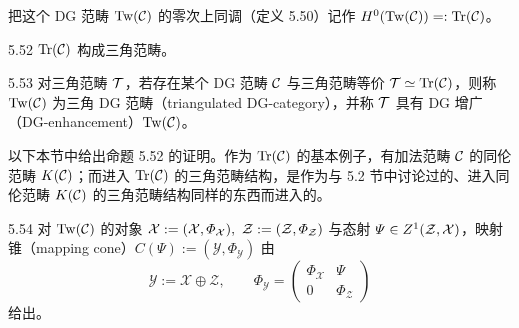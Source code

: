 把这个 DG 范畴 $\mathrm{Tw}(\mathcal{C})$ 的零次上同调（定义 5.50）记作 $H^{0}(\mathrm{Tw}(\mathcal{C})) =: \operatorname{Tr}(\mathcal{C})$。

\begin{proposition}{5.52} $\operatorname{Tr}(\mathcal{C})$ 构成三角范畴。\end{proposition}

\begin{definition}{5.53} 对三角范畴 $\mathcal{T}$，若存在某个 DG 范畴 $\mathcal{C}$ 与三角范畴等价 $\mathcal{T} \simeq \operatorname{Tr}(\mathcal{C})$，则称 $\mathrm{Tw}(\mathcal{C})$ 为三角 DG 范畴（triangulated DG-category），并称 $\mathcal{T}$ 具有 DG 增广（DG-enhancement）$\mathrm{Tw}(\mathcal{C})$。\end{definition}


以下本节中给出命题 5.52 的证明。作为 $\operatorname{Tr}(\mathcal{C})$ 的基本例子，有加法范畴 $\mathcal{C}$ 的同伦范畴 $K(\mathcal{C})$；而进入 $\operatorname{Tr}(\mathcal{C})$ 的三角范畴结构，是作为与 5.2 节中讨论过的、进入同伦范畴 $K(\mathcal{C})$ 的三角范畴结构同样的东西而进入的。


\begin{definition}{5.54} 对 $\mathrm{Tw}(\mathcal{C})$ 的对象 $\mathcal{X} := (\mathcal{X},\varPhi_{\mathcal{X}}),\ \mathcal{Z} := (\mathcal{Z},\varPhi_{\mathcal{Z}})$ 与态射 $\varPsi \in Z^{1}(\mathcal{Z},\mathcal{X})$，映射锥（mapping cone）$C(\varPsi) := (\mathcal{Y},\varPhi_{\mathcal{Y}})$ 由
\[
  \mathcal{Y} := \mathcal{X}\oplus\mathcal{Z}, \qquad
  \varPhi_{\mathcal{Y}} =
  \begin{pmatrix}
    \varPhi_{\mathcal{X}} & \varPsi\\
    0 & \varPhi_{\mathcal{Z}}
  \end{pmatrix}
\]
给出。\end{definition}

